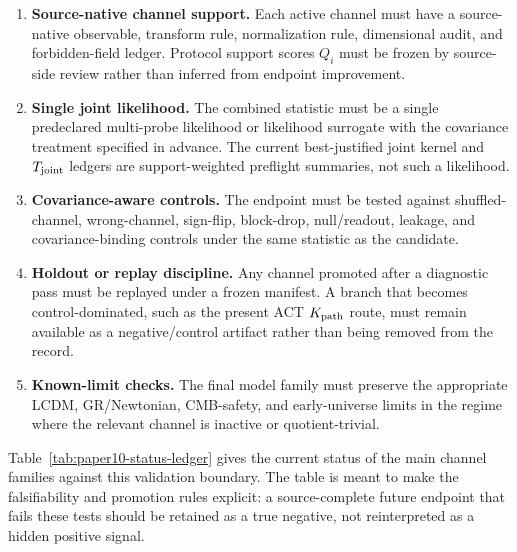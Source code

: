 \documentclass[11pt]{article}
\begin{document}
\begin{enumerate}[leftmargin=1.5em]
\item \textbf{Source-native channel support.}  Each active channel must have a
source-native observable, transform rule, normalization rule, dimensional audit,
and forbidden-field ledger.  Protocol support scores \(Q_i\) must be frozen by
source-side review rather than inferred from endpoint improvement.
\item \textbf{Single joint likelihood.}  The combined statistic must be a
single predeclared multi-probe likelihood or likelihood surrogate with the
covariance treatment specified in advance.  The current best-justified joint
kernel and \(T_{\rm joint}\) ledgers are support-weighted preflight summaries,
not such a likelihood.
\item \textbf{Covariance-aware controls.}  The endpoint must be tested against
shuffled-channel, wrong-channel, sign-flip, block-drop, null/readout, leakage,
and covariance-binding controls under the same statistic as the candidate.
\item \textbf{Holdout or replay discipline.}  Any channel promoted after a
diagnostic pass must be replayed under a frozen manifest.  A branch that becomes
control-dominated, such as the present ACT \(K_{\rm path}\) route, must remain
available as a negative/control artifact rather than being removed from the
record.
\item \textbf{Known-limit checks.}  The final model family must preserve the
appropriate LCDM, GR/\allowbreak Newtonian, CMB-safety, and early-universe limits in the
regime where the relevant channel is inactive or quotient-trivial.
\end{enumerate}

Table~\ref{tab:paper10-status-ledger} gives the current status of the main
channel families against this validation boundary.  The table is meant to make
the falsifiability and promotion rules explicit: a source-complete future
endpoint that fails these tests should be retained as a true negative, not
reinterpreted as a hidden positive signal.
\end{document}
